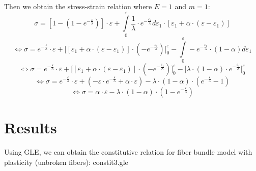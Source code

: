 \documentclass{article}
\begin{document}
Then we obtain the stress-strain relation where $E = 1$ and $m = 1$:
\begin{equation}
\sigma = [1 - (1 - e^{-\frac{\varepsilon}{\lambda}})] \cdot \varepsilon + \int\limits_0^\varepsilon \frac{1}{\lambda} \cdot e^{-\frac{\varepsilon_1}{\lambda}} d\varepsilon_1 \cdot [\varepsilon_1 + \alpha \cdot (\varepsilon - \varepsilon_1)]
\end{equation}
\begin{equation}
    \Leftrightarrow \sigma = e^{-\frac{\varepsilon}{\lambda}} \cdot \varepsilon + \bigg[[\varepsilon_1 + \alpha \cdot (\varepsilon - \varepsilon_1)] \cdot (- e^{-\frac{\varepsilon_1}{\lambda}})\bigg]_0^\varepsilon - \int\limits_0^\varepsilon - e^{-\frac{\varepsilon_1}{\lambda}} \cdot (1 - \alpha) d\varepsilon_1
\end{equation}
\begin{equation}
    \Leftrightarrow \sigma = e^{-\frac{\varepsilon}{\lambda}} \cdot \varepsilon + \bigg[[\varepsilon_1 + \alpha \cdot (\varepsilon - \varepsilon_1)] \cdot (- e^{-\frac{\varepsilon_1}{\lambda}})\bigg]_0^\varepsilon - \bigg[\lambda \cdot (1 - \alpha) \cdot e^{-\frac{\varepsilon_1}{\lambda}}\bigg]_0^\varepsilon   
\end{equation}
\begin{equation}
    \Leftrightarrow \sigma = e^{-\frac{\varepsilon}{\lambda}} \cdot \varepsilon + (- \varepsilon \cdot e^{-\frac{\varepsilon}{\lambda}} + \alpha \cdot \varepsilon) - \lambda \cdot (1 - \alpha) \cdot (e^{-\frac{\varepsilon}{\lambda}} - 1)
\end{equation}
\begin{equation}
    \Leftrightarrow \sigma = \alpha \cdot \varepsilon - \lambda \cdot (1 - \alpha) \cdot (1 - e^{-\frac{\varepsilon}{\lambda}})
\end{equation}

\section{Results}
Using GLE, we can obtain the constitutive relation for fiber bundle model with plasticity (unbroken fibers): constit3.gle
\end{document}
